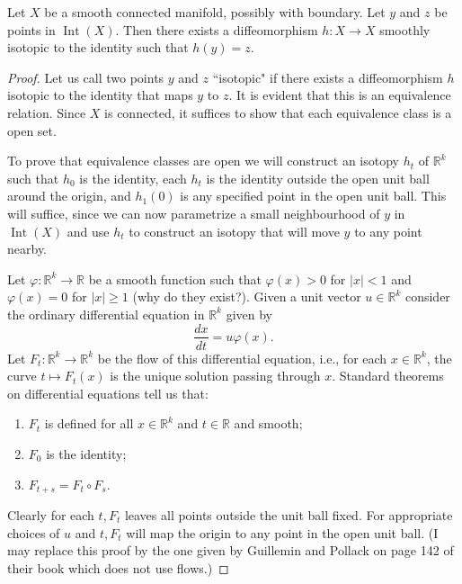 \documentclass[a4paper, 10pt, twocolumn]{amsart}
\begin{document}
\begin{lemma}
    Let $X$ be a smooth connected manifold, possibly with boundary. Let $y$ and $z$ be points in $\operatorname{Int}(X)$. Then there exists a diffeomorphism $h: X \rightarrow X$ smoothly isotopic to the identity such that $h(y)=z$. 
\end{lemma}
\begin{proof}
    Let us call two points $y$ and $z$ ``isotopic" if there exists a diffeomorphism $h$ isotopic to the identity that maps $y$ to $z$. It is evident that this is an equivalence relation. Since $X$ is connected, it suffices to show that each equivalence class is a open set.

To prove that equivalence classes are open we will construct an isotopy $h_{t}$ of $\mathbb{R}^{k}$ such that $h_{0}$ is the identity, each $h_{t}$ is the identity outside the open unit ball around the origin, and $h_{1}(0)$ is any specified point in the open unit ball. This will suffice, since we can now parametrize a small neighbourhood of $y$ in $\operatorname{Int}(X)$ and use $h_{t}$ to construct an isotopy that will move $y$ to any point nearby.

Let $\varphi: \mathbb{R}^{k} \rightarrow \mathbb{R}$ be a smooth function such that $\varphi(x)>0$ for $|x|<1$ and $\varphi(x)=0$ for $|x| \geq 1$ (why do they exist?). Given a unit vector $u \in \mathbb{R}^{k}$ consider the ordinary differential equation in $\mathbb{R}^{k}$ given by
$$
\frac{d x}{d t}=u \varphi(x).
$$
Let $F_{t}: \mathbb{R}^{k} \rightarrow \mathbb{R}^{k}$ be the flow of this differential equation, i.e., for each $x \in \mathbb{R}^{k}$, the curve $t \mapsto F_{t}(x)$ is the unique solution passing through $x$. Standard theorems on differential equations tell us that:
\begin{enumerate}
    \item $F_{t}$ is defined for all $x \in \mathbb{R}^{k}$ and $t \in \mathbb{R}$ and smooth;
    \item $F_{0}$ is the identity;
    \item $F_{t+s}=F_{t} \circ F_{s}$.
\end{enumerate}

Clearly for each $t, F_{t}$ leaves all points outside the unit ball fixed. For appropriate choices of $u$ and $t, F_{t}$ will map the origin to any point in the open unit ball.
(I may replace this proof by the one given by Guillemin and Pollack on page 142 of their book which does not use flows.)
\end{proof}
\end{document}
